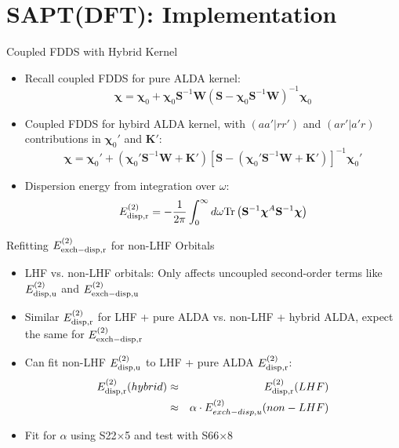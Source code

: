 \documentclass{beamer}
\begin{document}
\section{SAPT(DFT): Implementation}

    \begin{frame}{Coupled FDDS with Hybrid Kernel}
        \begin{itemize}
            \item Recall coupled FDDS for pure ALDA kernel:
            $$\boldsymbol{\chi} = \boldsymbol{\chi}_0 + \boldsymbol{\chi}_0 \mathbf{S}^{-1} \mathbf{W} \left( \mathbf{S} - \boldsymbol{\chi}_0 \mathbf{S}^{-1} \mathbf{W} \right)^{-1} \boldsymbol{\chi}_0$$
            \item Coupled FDDS for hybird ALDA kernel, with $(aa'|rr')$ and $(ar'|a'r)$ contributions in $\boldsymbol{\chi}_0'$ and $\mathbf{K}'$:
            $$\boldsymbol{\chi} = \boldsymbol{\chi}_0' + \left( \boldsymbol{\chi}_0' \mathbf{S}^{-1} \mathbf{W} + \mathbf{K}' \right) \left[ \mathbf{S} - \left( \boldsymbol{\chi}_0' \mathbf{S}^{-1} \mathbf{W} + \mathbf{K}' \right) \right]^{-1} \boldsymbol{\chi}_0'$$
            \item Dispersion energy from integration over $\omega$:
            $$E_{\rm{disp,r}}^{(2)} =  -\frac{1}{2\pi}\int_0^\infty d\omega \mathrm{Tr}\left(\mathbf{S}^{-1}\boldsymbol{\chi}^A\mathbf{S}^{-1}\boldsymbol{\chi}\right)$$
        \end{itemize}
    \end{frame}
        
    \begin{frame}{Refitting $E_{\rm{exch-disp,r}}^{(2)}$ for non-LHF Orbitals}
        \begin{itemize}
            \item LHF vs. non-LHF orbitals: Only affects uncoupled second-order terms like $E_{\rm{disp,u}}^{(2)}$ and $E_{\rm{exch-disp,u}}^{(2)}$
            \item Similar $E_{\rm{disp,r}}^{(2)}$ for LHF + pure ALDA vs. non-LHF + hybrid ALDA, expect the same for $E_{\rm{exch-disp,r}}^{(2)}$
            \item Can fit non-LHF $E_{\rm{disp,u}}^{(2)}$ to LHF + pure ALDA $E_{\rm{disp,r}}^{(2)}$:
            \begin{eqnarray}
                \nonumber
                E_{\rm{disp,r}}^{(2)}(hybrid) & \approx & E_{\rm{disp,r}}^{(2)}(LHF) \\ \nonumber
                & \approx & \alpha \cdot E^{(2)}_{exch-disp,u}(non-LHF)
            \end{eqnarray}
            \item Fit for $\alpha$ using S22$\times$5 and test with S66$\times$8
        \end{itemize}
    \end{frame}
\end{document}

